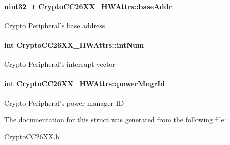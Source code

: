 \paragraph[{base\-Addr}]{\setlength{\rightskip}{0pt plus 5cm}uint32\-\_\-t Crypto\-C\-C26\-X\-X\-\_\-\-H\-W\-Attrs\-::base\-Addr}\label{struct_crypto_c_c26_x_x___h_w_attrs_a8a6e2dbc65c24f641941ebe3c854e961}
Crypto Peripheral's base address 
\paragraph[{int\-Num}]{\setlength{\rightskip}{0pt plus 5cm}int Crypto\-C\-C26\-X\-X\-\_\-\-H\-W\-Attrs\-::int\-Num}\label{struct_crypto_c_c26_x_x___h_w_attrs_a63cdd84637d1e9acca0315cd96d9891b}
Crypto Peripheral's interrupt vector 
\paragraph[{power\-Mngr\-Id}]{\setlength{\rightskip}{0pt plus 5cm}int Crypto\-C\-C26\-X\-X\-\_\-\-H\-W\-Attrs\-::power\-Mngr\-Id}\label{struct_crypto_c_c26_x_x___h_w_attrs_ac5c27633092355d3606d6d0b240b2091}
Crypto Peripheral's power manager I\-D 

The documentation for this struct was generated from the following file\-:\begin{DoxyCompactItemize}
\item 
\hyperlink{_crypto_c_c26_x_x_8h}{Crypto\-C\-C26\-X\-X.\-h}\end{DoxyCompactItemize}
